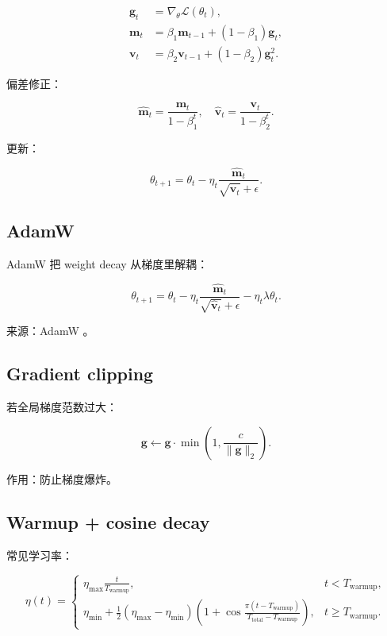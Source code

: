 \documentclass[UTF8,12pt]{ctexart}
\newcommand{\1}{\mathbf{1}}
\begin{document}
\begin{align}
\bm{g}_t&=\nabla_\theta \mathcal{L}(\theta_t),\\
\bm{m}_t&=\beta_1\bm{m}_{t-1}+(1-\beta_1)\bm{g}_t,\\
\bm{v}_t&=\beta_2\bm{v}_{t-1}+(1-\beta_2)\bm{g}_t^2.
\end{align}

偏差修正：

\begin{equation}
\hat{\bm{m}}_t=\frac{\bm{m}_t}{1-\beta_1^t},
\quad
\hat{\bm{v}}_t=\frac{\bm{v}_t}{1-\beta_2^t}.
\end{equation}

更新：

\begin{equation}
\theta_{t+1}
=\theta_t-\eta_t\frac{\hat{\bm{m}}_t}{\sqrt{\hat{\bm{v}}_t}+\epsilon}.
\end{equation}

\subsection{AdamW}

AdamW 把 weight decay 从梯度里解耦：

\begin{equation}
\theta_{t+1}
=\theta_t
-\eta_t\frac{\hat{\bm{m}}_t}{\sqrt{\hat{\bm{v}}_t}+\epsilon}
-\eta_t\lambda \theta_t.
\label{eq:adamw}
\end{equation}

来源：AdamW \cite{loshchilov2017adamw}。

\subsection{Gradient clipping}

若全局梯度范数过大：

\begin{equation}
\bm{g}\leftarrow
\bm{g}\cdot
\min\left(1,\frac{c}{\|\bm{g}\|_2}\right).
\end{equation}

作用：防止梯度爆炸。

\subsection{Warmup + cosine decay}

常见学习率：

\begin{equation}
\eta(t)=
\begin{cases}
\eta_{\max}\frac{t}{T_{\mathrm{warmup}}}, & t<T_{\mathrm{warmup}},\\
\eta_{\min}
+\frac{1}{2}(\eta_{\max}-\eta_{\min})
\left(1+\cos\frac{\pi(t-T_{\mathrm{warmup}})}{T_{\mathrm{total}}-T_{\mathrm{warmup}}}\right),
& t\ge T_{\mathrm{warmup}}.
\end{cases}
\end{equation}
\end{document}
